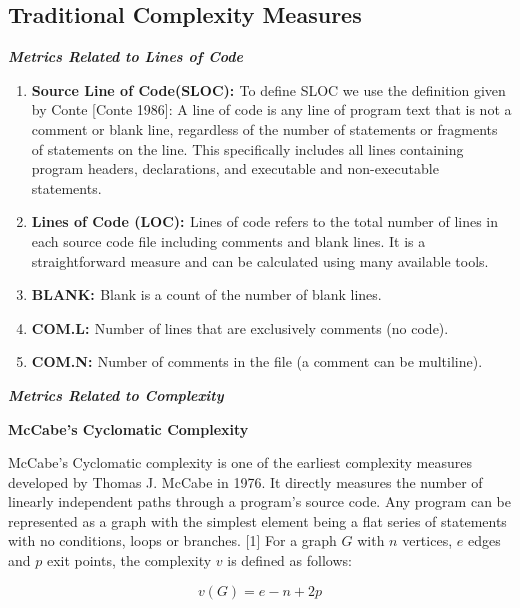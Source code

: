 \documentclass[8pt,twocolumn,a4paper]{article}
\begin{document}
\subsection{Traditional Complexity Measures}
{\bf{\emph{Metrics Related to Lines of Code}}}
\newline
\begin{enumerate}

\item{\bf{Source Line of Code(SLOC): }} To define SLOC we use the definition given by Conte [Conte 1986]:
A line of code is any line of program text that is not a comment or blank line, regardless of the
number of statements or fragments of statements on the line. This specifically includes all lines containing program headers, declarations, and executable and non-executable statements.

\item{\bf{Lines of Code (LOC): }} Lines of code refers to the total number of lines in each source code file including comments and blank lines. It is a straightforward measure and can be calculated using many available tools.


\item{\bf{BLANK: }}Blank is a count of the number of blank lines.

\item{\bf{COM.L: }}Number of lines that are exclusively comments (no code).

\item{\bf{COM.N: }} Number of comments in the file (a comment can be multiline).
\end{enumerate}


{\bf{\emph{Metrics Related to Complexity}}}
\newline

{\bf{McCabe's Cyclomatic Complexity}}\newline

McCabe’s Cyclomatic complexity is one of the earliest complexity measures developed by Thomas J. McCabe in 1976. It directly measures the number of linearly independent paths through a program's source code. Any program can be represented as a graph with the simplest element being a flat series of statements with no conditions, loops or branches. [1] For a graph $G$ with $n$ vertices, $e$ edges and $p$ exit points, the complexity $v$ is defined as follows:

\begin{equation}
v(G)=e-n+2p
\end{equation}
\end{document}
